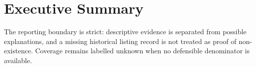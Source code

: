 \section{Executive Summary}



The reporting boundary is strict: descriptive evidence is separated from
possible explanations, and a missing historical listing record is not treated
as proof of non-existence. Coverage remains labelled unknown when no defensible
denominator is available.

